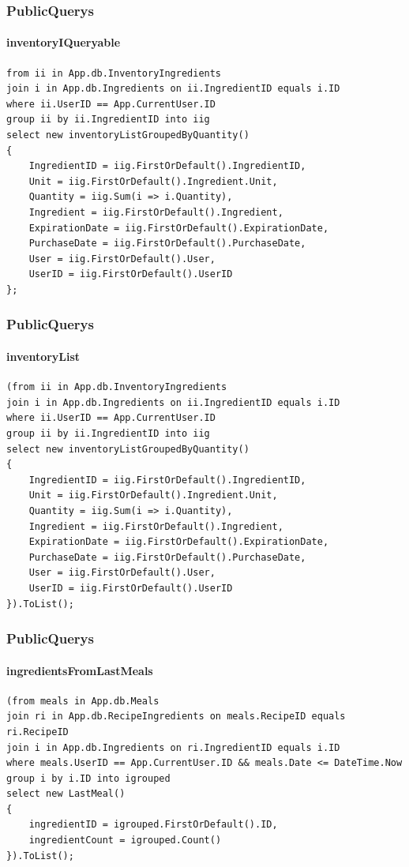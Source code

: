 \begin{frame}[fragile]
\frametitle{PublicQuerys}
\framesubtitle{inventoryIQueryable}
\fontsize{8pt}{7}\selectfont
\begin{lstlisting}
from ii in App.db.InventoryIngredients
join i in App.db.Ingredients on ii.IngredientID equals i.ID
where ii.UserID == App.CurrentUser.ID
group ii by ii.IngredientID into iig
select new inventoryListGroupedByQuantity()
{
    IngredientID = iig.FirstOrDefault().IngredientID,
    Unit = iig.FirstOrDefault().Ingredient.Unit,
    Quantity = iig.Sum(i => i.Quantity),
    Ingredient = iig.FirstOrDefault().Ingredient,
    ExpirationDate = iig.FirstOrDefault().ExpirationDate,
    PurchaseDate = iig.FirstOrDefault().PurchaseDate,
    User = iig.FirstOrDefault().User,
    UserID = iig.FirstOrDefault().UserID
};
\end{lstlisting}
\end{frame}

\begin{frame}[fragile]
\frametitle{PublicQuerys}
\framesubtitle{inventoryList}
\fontsize{8pt}{7}\selectfont
\begin{lstlisting}
(from ii in App.db.InventoryIngredients
join i in App.db.Ingredients on ii.IngredientID equals i.ID
where ii.UserID == App.CurrentUser.ID
group ii by ii.IngredientID into iig
select new inventoryListGroupedByQuantity()
{
    IngredientID = iig.FirstOrDefault().IngredientID,
    Unit = iig.FirstOrDefault().Ingredient.Unit,
    Quantity = iig.Sum(i => i.Quantity),
    Ingredient = iig.FirstOrDefault().Ingredient,
    ExpirationDate = iig.FirstOrDefault().ExpirationDate,
    PurchaseDate = iig.FirstOrDefault().PurchaseDate,
    User = iig.FirstOrDefault().User,
    UserID = iig.FirstOrDefault().UserID
}).ToList();
\end{lstlisting}
\end{frame}

\begin{frame}[fragile]
\frametitle{PublicQuerys}
\framesubtitle{ingredientsFromLastMeals}
\fontsize{8pt}{7}\selectfont
\begin{lstlisting}
(from meals in App.db.Meals
join ri in App.db.RecipeIngredients on meals.RecipeID equals ri.RecipeID
join i in App.db.Ingredients on ri.IngredientID equals i.ID
where meals.UserID == App.CurrentUser.ID && meals.Date <= DateTime.Now
group i by i.ID into igrouped
select new LastMeal()
{
    ingredientID = igrouped.FirstOrDefault().ID,
    ingredientCount = igrouped.Count()
}).ToList();
\end{lstlisting}
\end{frame}

